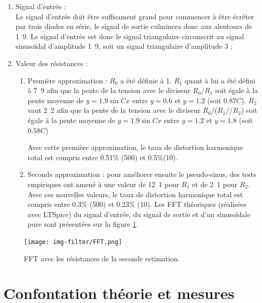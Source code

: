 \begin{enumerate}
	\item Signal d'entrée :\\
				Le signal d'entrée doit être suffisament grand pour commencer à être
				écrêter par trois diodes en série, le signal de sortie culminera donc
				aux alentours de \unit{1.9}{\volt}. Le signal d'entrée est donc le signal
				triangulaire circonscrit au signal sinusoïdal d'amplitude \unit{1.9}{\volt},
				soit un signal triangulaire d'amplitude \unit{3}{\volt} ;
	\item Valeur des résistances : \\
		\begin{enumerate}
			\item Première approximation : $R_0$ a été définie à \unit{1}{\kilo\ohm}. $R_1$ quant à lui
						a été défini à \unit{7.9}{\kilo\ohm} afin que la pente de la tension avec 
						le diviseur $R_0$/$R_1$ soit égale à la pente moyenne de $y = 1.9\sin{Cx}$ entre $y=0.6$
						et $y = 1.2$ (soit $0.87C$). $R_2$ vaut \unit{2.2}{\kilo\ohm} afin que la pente de la 
						tension avec le diviseur $R_0$/($R_1$//$R_2$) soit égale à la pente moyenne de $y = 1.9\sin{Cx}$
						entre $y = 1.2$ et $y = 1.8$ (soit $0.58C$)

						Avec cette première approximation, le taux de distortion harmonique total est compris entre 0.51\% 
						(\unit{500}{\hertz}) et 0.5\%(\unit{10}{\kilo\hertz}).
			\item Seconde approximation : pour améliorer ensuite le pseudo-sinus, des tests empiriques ont amené
						à une valeur de \unit{12.1}{\kilo\ohm} pour $R_1$ et de \unit{2.1}{\kilo\ohm} pour $R_2$.\\
						Avec ces nouvelles valeurs, le taux de distortion harmonique total est compris entre 0.3\% 
						(\unit{500}{\hertz}) et 0.23\% (\unit{10}{\kilo\hertz}). Les FFT
						théoriques (réalisées avec LTSpice) du signal d'entrée, du signal de sortie et d'un sinusoïdale
						pure sont présentées sur la figure \ref{fig:fft-filtre}.
		\end{enumerate}
\end{enumerate}

\begin{figure}[ht]
	\centering
	\texttt{[image: img-filter/FFT.png]}
	\caption{FFT avec les résistances de la seconde estimation.}
	\label{fig:fft-filtre}
\end{figure}

\section{Confontation théorie et mesures}

